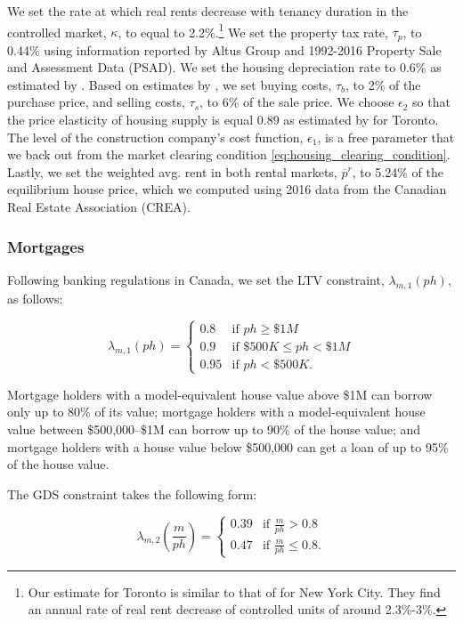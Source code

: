 \documentclass[parskip=full]{article}
\begin{document}
We set the rate at which real rents decrease with tenancy duration in the controlled market, $\kappa$, to equal to 2.2\%.\footnote{Our estimate for Toronto is similar to that of \citet{fmn-2022} for New York City. They find an annual rate of real rent decrease of controlled units of around 2.3\%-3\%.} We set the property tax rate, $\tau_p$, to 0.44\% using information reported by Altus Group and 1992-2016 Property Sale and Assessment Data (PSAD). We set the housing depreciation rate to 0.6\% as estimated by \citet{rosenthal-2014}. Based on estimates by \citet{gm-2003}, we set buying costs, $\tau_{b}$, to 2\% of the purchase price, and selling costs, $\tau_{s}$, to 6\% of the sale price. We choose $\epsilon_{2}$ so that the price elasticity of housing supply is equal $0.89$ as estimated by \citet{piaxao-2021} for Toronto. The level of the construction company's cost function, $\epsilon_1$, is a free parameter that we back out from the market clearing condition \eqref{eq:housing_clearing_condition}. Lastly, we set the weighted avg. rent in both rental markets, $\overline{p}^{r}$, to 5.24\% of the equilibrium house price, which we computed using 2016 data from the Canadian Real Estate Association (CREA).

\subsubsection{Mortgages}

Following banking regulations in Canada, we set the LTV constraint, $\lambda_{m,1}(ph)$, as follows:

\begin{equation*}
\lambda_{m,1}(ph) = \begin{cases}
0.8 &\text{if $ph\geq \$1M$}\\
0.9 &\text{if $\$500K\leq ph< \$1M$}\\
0.95 &\text{if $ph < \$500K$}.
\end{cases}
\end{equation*}

\noindent Mortgage holders with a model-equivalent house value above \$1M can borrow only up to 80\% of its value; mortgage holders with a model-equivalent house value between \$500,000--\$1M can borrow up to 90\% of the house value; and mortgage holders with a house value below \$500,000 can get a loan of up to 95\% of the house value. 

The GDS constraint takes the following form:

\begin{equation*}
\lambda_{m,2}\left(\frac{m}{ph}\right) = \begin{cases}
0.39 &\text{if $\frac{m}{ph}>0.8$}\\
0.47 &\text{if $\frac{m}{ph}\leq 0.8$}.
\end{cases}
\end{equation*}
\end{document}

